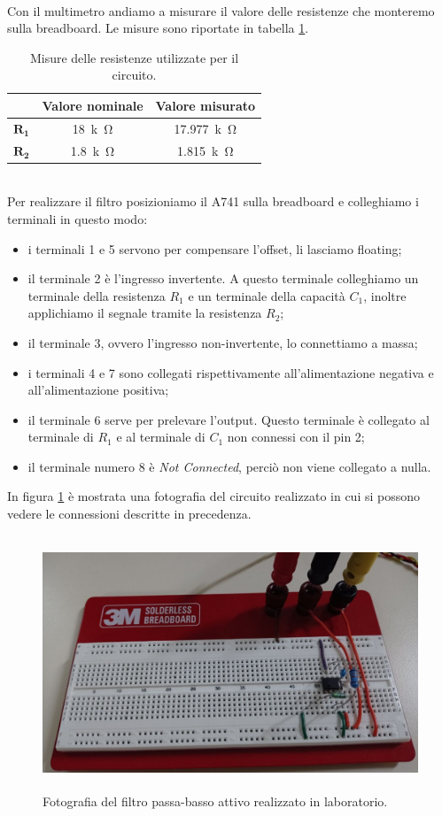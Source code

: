 \documentclass{report}
\begin{document}
\\Con il multimetro andiamo a misurare il valore delle resistenze che monteremo sulla breadboard. Le misure sono riportate in tabella \ref{table:mis_res}.
\begin{table}[h]
	\centering
	\begin{tabular}{|c|c|c|}
	\cline{2-3} 
	\multicolumn{1}{c|}{} & \textbf{Valore nominale} & \textbf{Valore misurato}\\ 
		\hline
		$\mathbf{R_1}$ & \SI{18}{k\ohm} & \SI{17.977}{k\ohm} \\ 
		\hline
		$\mathbf{R_2}$& \SI{1.8}{k\ohm} & \SI{1.815}{k\ohm} \\ 
		\hline
	\end{tabular}
\caption{Misure delle resistenze utilizzate per il circuito.}
\label{table:mis_res}
\end{table}
\\Per realizzare il filtro posizioniamo il \textmu A741 sulla breadboard e colleghiamo i terminali in questo modo:
\begin{itemize}
\item i terminali 1 e 5 servono per compensare l'offset, li lasciamo floating;
\item il terminale 2 è l'ingresso invertente. A questo terminale colleghiamo un terminale della resistenza $R_1$ e un terminale della capacità $C_1$, inoltre applichiamo il segnale tramite la resistenza $R_2$;
\item il terminale 3, ovvero l'ingresso non-invertente, lo connettiamo a massa;
\item i terminali 4 e 7 sono collegati rispettivamente all'alimentazione  negativa e all'alimentazione positiva;
\item il terminale 6 serve per prelevare l'output. Questo terminale è collegato al terminale di $R_1$ e al terminale di $C_1$ non connessi con il pin 2;
\item il terminale numero 8 è \textit{Not Connected}, perciò non viene collegato a nulla.
\end{itemize}
In figura \ref{figura:foto_circ} è mostrata una fotografia del circuito realizzato in cui si possono vedere le connessioni descritte in precedenza.
\begin{figure}[h!]
\centering
\includegraphics[height=7.6cm]{immagini/circuito}
\caption{Fotografia del filtro passa-basso attivo realizzato in laboratorio.}
\label{figura:foto_circ}
\end{figure}
\end{document}
